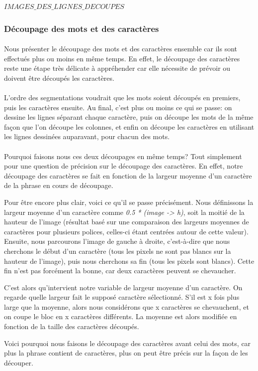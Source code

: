 \documentclass{article}
\begin{document}
	$IMAGES\_DES\_LIGNES\_DECOUPES$
	
	\subsubsection{Découpage des mots et des caractères}
	\paragraph{}
	Nous présenter le découpage des mots et des caractères ensemble car ils sont effectués plus ou moins en même temps. En effet, le découpage des caractères reste une étape très délicate à appréhender car elle nécessite de prévoir ou doivent être découpés les caractères.
	
	\paragraph{}
	L'ordre des segmentations voudrait que les mots soient découpés en premiers, puis les caractères ensuite. Au final, c'est plus ou moins ce qui se passe: on dessine les lignes séparant chaque caractère, puis on découpe les mots de la même façon que l'on découpe les colonnes, et enfin on découpe les caractères en utilisant les lignes dessinées auparavant, pour chacun des mots.
	
	\paragraph{}
	Pourquoi faisons nous ces deux découpages en même temps? Tout simplement pour une question de précision sur le découpage des caractères. En effet, notre découpage des caractères se fait en fonction de la largeur moyenne d'un caractère de la phrase en cours de découpage.
	\par Pour être encore plus clair, voici ce qu'il se passe précisément. Nous définissons la largeur moyenne d'un caractère comme \textit{0.5 * (image -> h)}, soit la moitié de la hauteur de l'image (résultat basé sur une comparaison des largeurs moyennes de caractères pour plusieurs polices, celles-ci étant centrées autour de cette valeur). Ensuite, nous parcourons l'image de gauche à droite, c'est-à-dire que nous cherchons le début d'un caractère (tous les pixels ne sont pas blancs sur la hauteur de l'image), puis nous cherchons sa fin (tous les pixels sont blancs). Cette fin n'est pas forcément la bonne, car deux caractères peuvent se chevaucher.
	\par C'est alors qu'intervient notre variable de largeur moyenne d'un caractère. On regarde quelle largeur fait le supposé caractère sélectionné. S'il est x fois plus large que la moyenne, alors nous considérons que x caractères se chevauchent, et on coupe le bloc en x caractères différents. La moyenne est alors modifiée en fonction de la taille des caractères découpés.
	\par Voici pourquoi nous faisons le découpage des caractères avant celui des mots, car plus la phrase contient de caractères, plus on peut être précis sur la façon de les découper.
	
\end{document}
